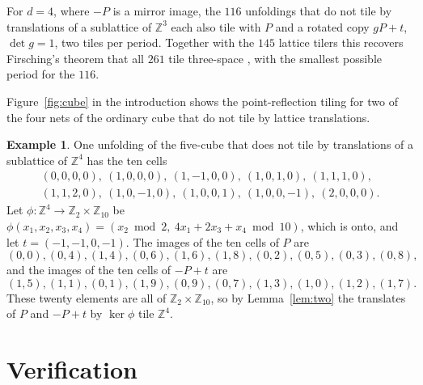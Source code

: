 \documentclass[11pt]{amsart}
\theoremstyle{definition}
\newtheorem{example}[theorem]{Example}
\theoremstyle{remark}
\newcommand{\Z}{\mathbb{Z}}
\begin{document}
For $d=4$, where $-P$ is a mirror image, the $116$ unfoldings that do not tile by translations of a sublattice of $\Z^3$ each also tile with $P$ and a rotated copy $gP+t$, $\det g=1$, two tiles per period. Together with the $145$ lattice tilers this recovers Firsching's theorem that all $261$ tile three-space \cite{Firsching}, with the smallest possible period for the $116$.

Figure~\ref{fig:cube} in the introduction shows the point-reflection tiling for two of the four nets of the ordinary cube that do not tile by lattice translations.


\begin{example}\label{ex:five}
One unfolding of the five-cube that does not tile by translations of a sublattice of $\Z^4$ has the ten cells
\begin{gather*}
(0,0,0,0),\ (1,0,0,0),\ (1,-1,0,0),\ (1,0,1,0),\ (1,1,1,0),\\
(1,1,2,0),\ (1,0,-1,0),\ (1,0,0,1),\ (1,0,0,-1),\ (2,0,0,0).
\end{gather*}
Let $\phi\colon\Z^4\to\Z_2\times\Z_{10}$ be $\phi(x_1,x_2,x_3,x_4)=(x_2 \bmod 2,\ 4x_1+2x_3+x_4 \bmod 10)$, which is onto, and let $t=(-1,-1,0,-1)$. The images of the ten cells of $P$ are
\[
(0,0),(0,4),(1,4),(0,6),(1,6),(1,8),(0,2),(0,5),(0,3),(0,8),
\]
and the images of the ten cells of $-P+t$ are
\[
(1,5),(1,1),(0,1),(1,9),(0,9),(0,7),(1,3),(1,0),(1,2),(1,7).
\]
These twenty elements are all of $\Z_2\times\Z_{10}$, so by Lemma~\ref{lem:two} the translates of $P$ and $-P+t$ by $\ker\phi$ tile $\Z^4$.
\end{example}

\section{Verification}\label{sec:verify}
\end{document}
